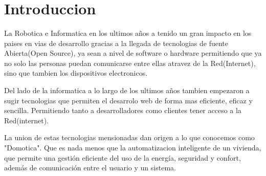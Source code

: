 \documentclass[letterpaper,12pt]{article}
\begin{document}
{\begin{center}
\begin{minipage}[b]{5cm}
			\end{minipage}\\
			[1cm]
			
			{\fontsize{12}{3}\selectfont{Area :   Internet of Things}}\\
			[0.5cm]
			{\fontsize{12}{3}\selectfont{Materia  :   Web, Robotica}}\\
			[3cm]

			
			{\fontsize{12}{3}\selectfont{Cochabamba, 2018}}\\[0.5cm]
		\end{center}
		
		
		
		\vspace{1cm}
		\ %
		
		
		
		\tableofcontents
		\newpage
		
		
		
		\section{Introduccion}
		\vspace{1cm}
		
		La Robotica e Informatica en los ultimos años a tenido un gran impacto en los paises en vias de desarrollo gracias a la llegada de tecnologias de fuente Abierta(Open Source), ya sean a nivel de software o hardware  permitiendo que ya no solo las personas  puedan comunicarse entre ellas atravez de la Red(Internet), sino que tambien los dispositivos electronicos.
		
		Del lado de la informatica a lo largo de los ultimos años tambien  empezaron a sugir tecnologias que permiten el desarrolo web de forma mas eficiente, eficaz y sencilla. Permitiendo tanto a desarrolladores como clientes tener acceso  a la Red(internet).
		
		
		La union de estas tecnologias mensionadas dan origen a lo que conocemos como "Domotica". Que es nada menos que la automatizacion inteligente de un vivienda, que permite una gestión eficiente del uso de la energía, seguridad y confort, además de comunicación entre el usuario y un sistema. 
		
}
\end{document}
